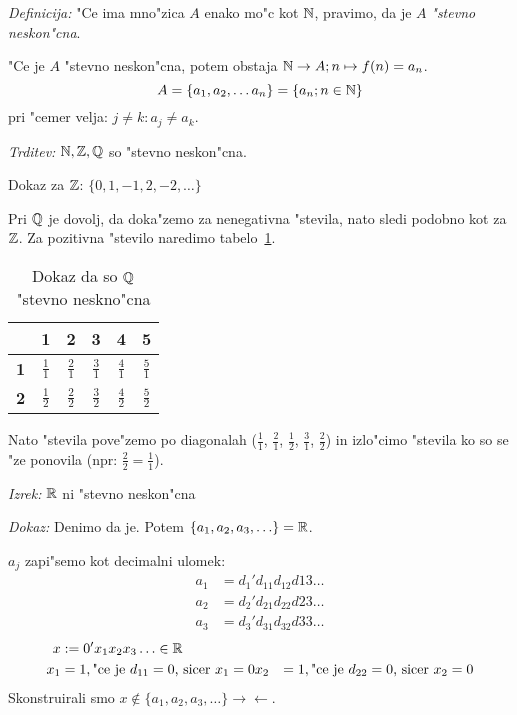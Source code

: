\emph{Definicija:} "Ce ima mno"zica $A$ enako mo"c kot $\mathbb{N}$, pravimo, da je $A$ \emph{"stevno neskon"cna}.

"Ce je $A$ "stevno neskon"cna, potem obstaja $\mathbb{N} \rightarrow A; n \mapsto f(n) = a_n$.
\begin{equation*}
A = \{a_1, a_2, \ldots a_n\} = \{a_n; n \in \mathbb{N}\}
\end{equation*}
pri "cemer velja: $j \neq k: a_j \neq a_k$.

\emph{Trditev:} $\mathbb{N}, \mathbb{Z}, \mathbb{Q}$ so "stevno neskon"cna.

Dokaz za $\mathbb{Z}$: $\{0, 1, -1, 2, -2, \ldots\}$

Pri $\mathbb{Q}$ je dovolj, da doka"zemo za nenegativna "stevila, nato sledi podobno kot za $\mathbb{Z}$. Za pozitivna "stevilo naredimo tabelo~\ref{tab:rac-dokaz}.

\begin{table}[htp]
	\centering
	\begin{tabular}{c|ccccc}
		 & \textbf{1} & \textbf{2} & \textbf{3} & \textbf{4} & \textbf{5} \\ \hline
		\textbf{1} & $\frac{1}{1}$ & $\frac{2}{1}$ & $\frac{3}{1}$ & $\frac{4}{1}$ & $\frac{5}{1}$\\
		\textbf{2} & $\frac{1}{2}$ & $\frac{2}{2}$ & $\frac{3}{2}$ & $\frac{4}{2}$ & $\frac{5}{2}$
	\end{tabular}
	\caption{Dokaz da so $\mathbb{Q}$ "stevno neskno"cna}
	\label{tab:rac-dokaz}
\end{table}

Nato "stevila pove"zemo po diagonalah ($\frac{1}{1}$, $\frac{2}{1}$, $\frac{1}{2}$, $\frac{3}{1}$, $\frac{2}{2}$) in izlo"cimo "stevila ko so se "ze ponovila (npr: $\frac{2}{2} = \frac{1}{1}$).

\emph{Izrek:} $\mathbb{R}$ ni "stevno neskon"cna

\emph{Dokaz:} Denimo da je. Potem $\{a_1, a_2, a_3, \ldots\} = \mathbb{R}$.

$a_j$ zapi"semo kot decimalni ulomek:
\begin{align*}
a_1 &= d_1'd_{11}d_{12}d{13}\ldots\\
a_2 &= d_2'd_{21}d_{22}d{23}\ldots\\
a_3 &= d_3'd_{31}d_{32}d{33}\ldots
\end{align*}
%
\begin{align*}
x &:= 0'x_1x_2x_3\ldots \in \mathbb{R}\\
x_1 &= 1, \text{"ce je $d_{11} = 0$, sicer $x_1 = 0$}
x_2 &= 1, \text{"ce je $d_{22} = 0$, sicer $x_2 = 0$}
\end{align*}
Skonstruirali smo $x \notin \{a_1, a_2, a_3, \ldots\} \rightarrow \leftarrow$.